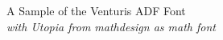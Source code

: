 \documentclass[11pt]{article}
\begin{document}
{\LARGE \noindent A Sample of the Venturis ADF Font}\\

{\large \noindent \textit{with Utopia from mathdesign as math font}}\\[5pt]


\end{document}
